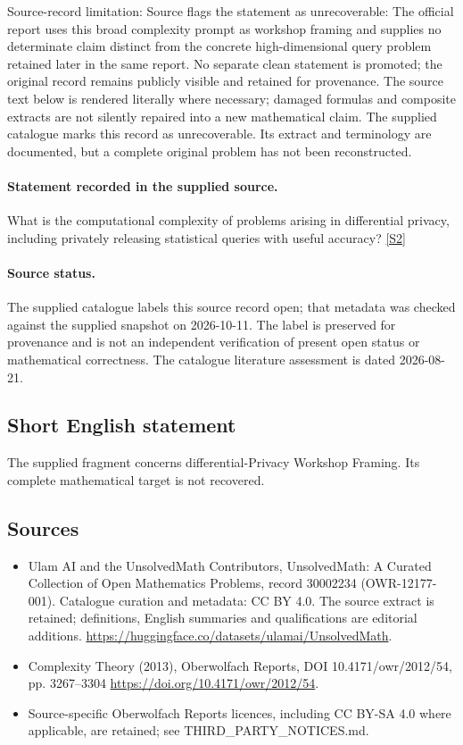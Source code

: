 \documentclass[11pt]{article}
\begin{document}
Source-record limitation: Source flags the statement as unrecoverable: The official report uses this broad complexity prompt as workshop framing and supplies no determinate claim distinct from the concrete high-dimensional query problem retained later in the same report. No separate clean statement is promoted; the original record remains publicly visible and retained for provenance.
The source text below is rendered literally where necessary; damaged formulas and composite extracts are not silently repaired into a new mathematical claim.
The supplied catalogue marks this record as unrecoverable. Its extract and terminology are documented, but a complete original problem has not been reconstructed.
\paragraph{Statement recorded in the supplied source.}
What is the computational complexity of problems arising in differential privacy, including privately releasing statistical queries with useful accuracy? \href{https://doi.org/10.4171/owr/2012/54}{[S2]}
\paragraph{Source status.}
The supplied catalogue labels this source record open; that metadata was checked against the supplied snapshot on 2026-10-11. The label is preserved for provenance and is not an independent verification of present open status or mathematical correctness. The catalogue literature assessment is dated 2026-08-21.
\subsection{Short English statement}
The supplied fragment concerns differential-Privacy Workshop Framing. Its complete mathematical target is not recovered.
\subsection{Sources}
\begin{itemize}
\item[S1] Ulam AI and the UnsolvedMath Contributors, UnsolvedMath: A Curated Collection of Open Mathematics Problems, record 30002234 (OWR-12177-001). Catalogue curation and metadata: CC BY 4.0. The source extract is retained; definitions, English summaries and qualifications are editorial additions.
\url{https://huggingface.co/datasets/ulamai/UnsolvedMath}.
\item[S2] Complexity Theory (2013), Oberwolfach Reports, DOI 10.4171/owr/2012/54, pp. 3267--3304
\url{https://doi.org/10.4171/owr/2012/54}.
\item Source-specific Oberwolfach Reports licences, including CC BY-SA 4.0 where applicable, are retained; see THIRD\_PARTY\_NOTICES.md.
\end{itemize}
\end{document}
